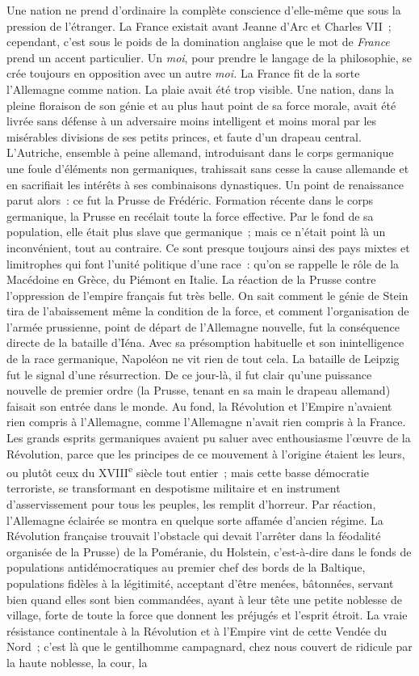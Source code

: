 \documentclass[french,twoside]{book} %
\begin{document}
Une nation ne prend d’ordinaire la complète conscience d’elle-même que sous la pression de l’étranger. La France existait avant Jeanne d’Arc et Charles VII ; cependant, c’est sous le poids de la domination anglaise que le mot de {\itshape France} prend un accent particulier. Un {\itshape moi}, pour prendre le langage de la philosophie, se crée toujours en opposition avec un autre {\itshape moi.} La France fit de la sorte l’Allemagne comme nation. La plaie avait été trop visible. Une nation, dans la pleine floraison de son génie et au plus haut point de sa force morale, avait été livrée sans défense à un adversaire moins intelligent et moins moral par les misérables divisions de ses petits princes, et faute d’un drapeau central. L’Autriche, ensemble à peine allemand, introduisant dans le corps germanique une foule d’éléments non germaniques, trahissait sans cesse la cause allemande et en sacrifiait les intérêts à ses combinaisons dynastiques. Un point de renaissance parut alors : ce fut la Prusse de Frédéric. Formation récente dans le corps germanique, la Prusse en recélait toute la force effective. Par le fond de sa population, elle était plus slave que germanique ; mais ce n’était point là un inconvénient, tout au contraire. Ce sont presque toujours ainsi des pays mixtes et limitrophes qui font l’unité politique d’une race : qu’on se rappelle le rôle de la Macédoine en Grèce, du Piémont en Italie. La réaction de la Prusse contre l’oppression de l’empire français fut très belle. On sait comment le génie de Stein tira de l’abaissement même la condition de la force, et comment l’organisation de l’armée prussienne, point de départ de l’Allemagne nouvelle, fut la conséquence directe de la bataille d’Iéna. Avec sa présomption habituelle et son inintelligence de la race germanique, Napoléon ne vit rien de tout cela. La bataille de Leipzig fut le signal d’une résurrection. De ce jour-là, il fut clair qu’une puissance nouvelle de premier ordre (la Prusse, tenant en sa main le drapeau allemand) faisait son entrée dans le monde. Au fond, la Révolution et l’Empire n’avaient rien compris à l’Allemagne, comme l’Allemagne n’avait rien compris à la France. Les grands esprits germaniques avaient pu saluer avec enthousiasme l’œuvre de la Révolution, parce que les principes de ce mouvement à l’origine étaient les leurs, ou plutôt ceux du XVIII\textsuperscript{e} siècle tout entier ; mais cette basse démocratie terroriste, se transformant en despotisme militaire et en instrument d’asservissement pour tous les peuples, les remplit d’horreur. Par réaction, l’Allemagne éclairée se montra en quelque sorte affamée d’ancien régime. La Révolution française trouvait l’obstacle qui devait l’arrêter dans la féodalité organisée de la Prusse) de la Poméranie, du Holstein, c’est-à-dire dans le fonds de populations antidémocratiques au premier chef des bords de la Baltique, populations fidèles à la légitimité, acceptant d’être menées, bâtonnées, servant bien quand elles sont bien commandées, ayant à leur tête une petite noblesse de village, forte de toute la force que donnent les préjugés et l’esprit étroit. La vraie résistance continentale à la Révolution et à l’Empire vint de cette Vendée du Nord ; c’est là que le gentilhomme campagnard, chez nous couvert de ridicule par la haute noblesse, la cour, la 
\end{document}
